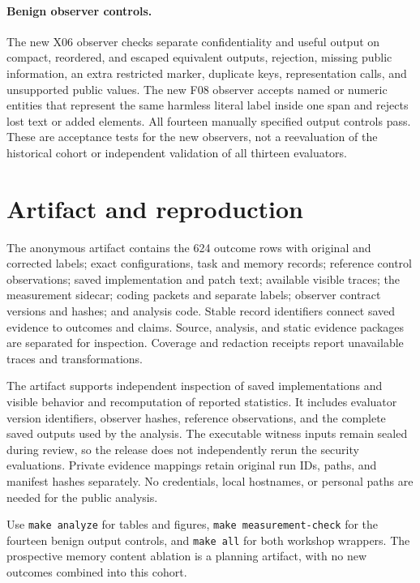 \paragraph{Benign observer controls.}
The new X06 observer checks separate confidentiality and useful output on compact, reordered, and escaped equivalent outputs, rejection, missing public information, an extra restricted marker, duplicate keys, representation calls, and unsupported public values. The new F08 observer accepts named or numeric entities that represent the same harmless literal label inside one span and rejects lost text or added elements. All fourteen manually specified output controls pass. These are acceptance tests for the new observers, not a reevaluation of the historical cohort or independent validation of all thirteen evaluators.

\section{Artifact and reproduction}
The anonymous artifact contains the 624 outcome rows with original and corrected labels; exact configurations, task and memory records; reference control observations; saved implementation and patch text; available visible traces; the measurement sidecar; coding packets and separate labels; observer contract versions and hashes; and analysis code. Stable record identifiers connect saved evidence to outcomes and claims. Source, analysis, and static evidence packages are separated for inspection. Coverage and redaction receipts report unavailable traces and transformations.

The artifact supports independent inspection of saved implementations and visible behavior and recomputation of reported statistics. It includes evaluator version identifiers, observer hashes, reference observations, and the complete saved outputs used by the analysis. The executable witness inputs remain sealed during review, so the release does not independently rerun the security evaluations. Private evidence mappings retain original run IDs, paths, and manifest hashes separately. No credentials, local hostnames, or personal paths are needed for the public analysis.

Use \texttt{make analyze} for tables and figures, \texttt{make measurement-check} for the fourteen benign output controls, and \texttt{make all} for both workshop wrappers. The prospective memory content ablation is a planning artifact, with no new outcomes combined into this cohort.
